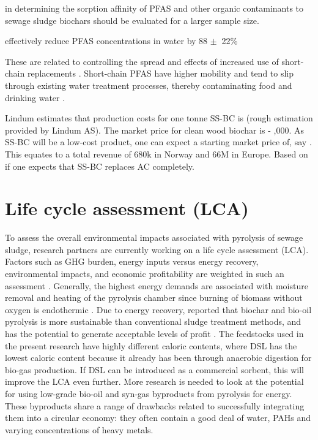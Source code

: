 in determining the sorption affinity of PFAS and other organic contaminants to sewage sludge biochars should be evaluated for a larger sample size.


effectively reduce PFAS concentrations in water by 88 $\pm~$ 22\%

These are related to controlling the spread and effects of increased use of short-chain replacements \citep{knutsen2019leachate}. Short-chain PFAS have higher mobility and tend to slip through existing water treatment processes, thereby contaminating food and drinking water \citep{hale2020persistent,brendel2018short}.

Lindum estimates that production costs for one tonne SS-BC is  (rough estimation provided by Lindum AS). The market price for clean wood biochar is  - ,000. As SS-BC will be a low-cost product, one can expect a starting market price of, say .  This equates to a total revenue of \texteuro 680k in Norway and \texteuro 66M in Europe. Based on if one expects that SS-BC replaces AC completely.

\section{Life cycle assessment (LCA) \label{sec:LCA}}
To assess the overall environmental impacts associated with pyrolysis of sewage sludge, research partners are currently working on a life cycle assessment (LCA). Factors such as GHG burden, energy inputs versus energy recovery, environmental impacts, and economic profitability are weighted in such an assessment \citep{huang2022comparative}. Generally, the highest energy demands are associated with moisture removal and heating of the pyrolysis chamber since burning of biomass without oxygen is endothermic \citep{mcnamara2016pyrolysis}. Due to energy recovery, \cite{huang2022comparative} reported that biochar and bio-oil pyrolysis is more sustainable than conventional sludge treatment methods, and has the potential to generate acceptable levels of profit \cite{huang2022comparative}. The feedstocks used in the present research have highly different caloric contents, where DSL has the lowest caloric content because it already has been through anaerobic digestion for bio-gas production. If DSL can be introduced as a commercial sorbent, this will improve the LCA even further. More research is needed to look at the potential for using low-grade bio-oil and syn-gas byproducts from pyrolysis for energy. These byproducts share a range of drawbacks related to successfully integrating them into a circular economy: they often contain a good deal of water, PAHs and varying concentrations of heavy metals. 

